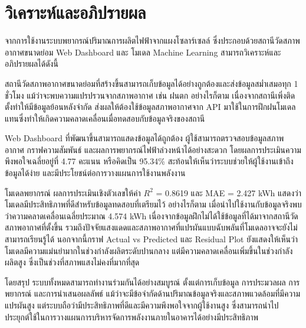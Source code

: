 \section{วิเคราะห์และอภิปรายผล}
\hspace{\parindent} จากการใช้งานระบบพยากรณ์ปริมาณการผลิตไฟฟ้าจากแผงโซลาร์เซลล์ ซึ่งประกอบด้วยสถานีวัดสภาพอากาศขนาดย่อม Web Dashboard และ โมเดล Machine Learning สามารถวิเคราะห์และอภิปรายผลได้ดังนี้

สถานีวัดสภาพอากาศขนาดย่อมที่สร้างขึ้นสามารถเก็บข้อมูลได้อย่างถูกต้องและส่งข้อมูลสม่ำเสมอทุก 1 ชั่วโมง แม้ว่าจะพบความแปรปรวนจากสภาพอากาศ เช่น ฝนตก อย่างไรก็ตาม เนื่องจากสถานีเพิ่งติดตั้งทำให้มีข้อมูลย้อนหลังจำกัด ส่งผลให้ต้องใช้ข้อมูลสภาพอากาศจาก API มาใช้ในการฝึกฝนโมเดลแทนซึ่งทำให้เกิดความคลาดเคลื่อนเมื่อทดสอบกับข้อมูลจริงของสถานี

Web Dashboard ที่พัฒนาขึ้นสามารถแสดงข้อมูลได้ถูกต้อง ผู้ใช้สามารถตรวจสอบข้อมูลสภาพอากาศ กราฟความสัมพันธ์ และผลการพยากรณ์ไฟฟ้าล่วงหน้าได้อย่างสะดวก โดยผลการประเมินความพึงพอใจเฉลี่ยอยู่ที่ 4.77 คะแนน หรือคิดเป็น 95.34\% สะท้อนให้เห็นว่าระบบช่วยให้ผู้ใช้งานเข้าถึงข้อมูลได้ง่าย และมีประโยชน์ต่อการวางแผนการใช้งานพลังงาน

โมเดลพยากรณ์ ผลการประเมินเชิงตัวเลขให้ค่า $R^2$ = 0.8619 และ MAE = 2.427 kWh แสดงว่าโมเดลมีประสิทธิภาพที่ดีสำหรับข้อมูลทดสอบที่เตรียมไว้ อย่างไรก็ตาม เมื่อนำไปใช้งานกับข้อมูลจริงพบว่าความคลาดเคลื่อนเฉลี่ยประมาณ 4.574 kWh เนื่องจากข้อมูลฝึกไม่ได้ใช้ข้อมูลที่ได้มาจากสถานีวัดสภาพอากาศที่ตั้งขึ้น รวมถึงปัจจัยแสงแดดและสภาพอากาศที่แปรผันแบบฉับพลันที่โมเดลอาจจะยังไม่สามารถเรียนรู้ได้ นอกจากนี้กราฟ Actual vs Predicted และ Residual Plot ยังแสดงให้เห็นว่าโมเดลมีความแม่นยำมากในช่วงกำลังผลิตระดับปานกลาง แต่มีความคลาดเคลื่อนเพิ่มขึ้นในช่วงกำลังผลิตสูง ซึ่งเป็นช่วงที่สภาพแสงไม่คงที่มากที่สุด

โดยสรุป ระบบทั้งหมดสามารถทำงานร่วมกันได้อย่างสมบูรณ์ ตั้งแต่การเก็บข้อมูล การประมวลผล การพยากรณ์ และการนำเสนอผลลัพธ์ แม้ว่าจะมีข้อจำกัดด้านปริมาณข้อมูลจริงและสภาพแวดล้อมที่มีความแปรผันสูง แต่ระบบถือว่ามีประสิทธิภาพที่ดีและมีความพึงพอใจจากผู้ใช้งานสูง ซึ่งสามารถนำไปประยุกต์ใช้ในการวางแผนการบริหารจัดการพลังงานภายในอาคารได้อย่างมีประสิทธิภาพ

